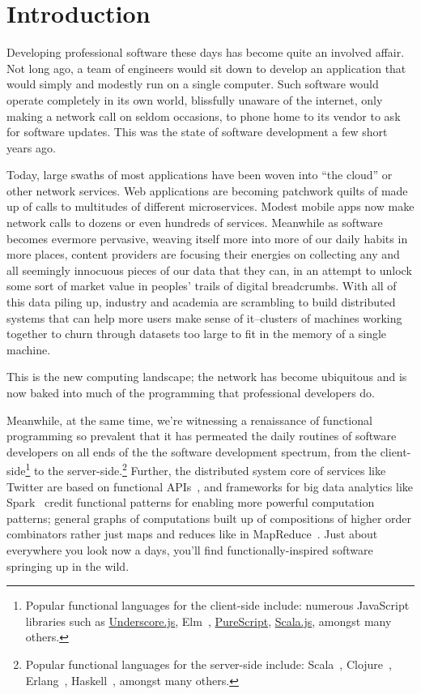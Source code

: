 \chapter{Introduction}

Developing professional software these days has become quite an involved affair.
Not long ago, a team of engineers would sit down to develop an application that
would simply and modestly run on a single computer. Such software would operate
completely in its own world, blissfully unaware of the internet, only making a
network call on seldom occasions, \eg to phone home to its vendor to ask for
software updates. This was the state of software development a few short years
ago.


Today, large swaths of most applications have been woven into ``the cloud'' or
other network services. Web applications are becoming patchwork quilts of made
up of calls to multitudes of different microservices. Modest mobile apps now
make network calls to dozens or even hundreds of services. Meanwhile as software
becomes evermore pervasive, weaving itself more into more of our daily habits in
more places, content providers are focusing their energies on collecting any and
all seemingly innocuous pieces of our data that they can, in an attempt to
unlock some sort of market value in peoples' trails of digital breadcrumbs. With
all of this data piling up, industry and academia are scrambling to build
distributed systems that can help more users make sense of it--clusters of
machines working together to churn through datasets too large to fit in the
memory of a single machine.

This is the new computing landscape; the network has become ubiquitous and is
now baked into much of the programming that professional developers do.

Meanwhile, at the same time, we're witnessing a renaissance of functional
programming so prevalent that it has permeated the daily routines of software
developers on all ends of the the software development spectrum, from the
client-side\footnote{Popular functional languages for the client-side include:
numerous JavaScript libraries such as
\href{http://underscorejs.org}{Underscore.js}, Elm~\cite{Elm},
\href{http://www.purescript.org/}{PureScript},
\href{http://www.scala-js.org/}{Scala.js}, amongst many others.} to the
server-side.\footnote{Popular functional languages for the server-side include:
Scala~\cite{Odersky10}, Clojure~\cite{Clojure}, Erlang~\cite{Erlang},
Haskell~\cite{Haskell}, amongst many others.} Further, the distributed system
core of services like Twitter are based on functional APIs~\cite{Eriksen2013},
and frameworks for big data analytics like Spark~\cite{Spark} credit functional
patterns for enabling more powerful computation patterns; \ie general graphs of
computations built up of compositions of higher order combinators rather just
maps and reduces like in MapReduce~\cite{MateiScalaByTheBay}. Just about
everywhere you look now a days, you'll find functionally-inspired software
springing up in the wild.


